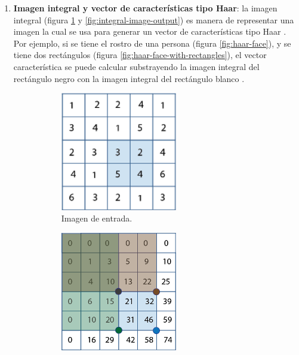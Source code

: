 \documentclass[a4paper,openright,12pt]{report}
\begin{document}
\begin{enumerate}
    \item \textbf{Imagen integral y vector de características tipo Haar}:
    la imagen integral (figura \ref{fig:integral-image-input} y
    \ref{fig:integral-image-output}) es manera de representar una imagen
    la cual se usa para generar un vector de características tipo Haar
    \cite{violajones}. Por ejemplo, si se tiene el rostro de una persona
    (figura \ref{fig:haar-face}), y se tiene dos rectángulos
    (figura \ref{fig:haar-face-with-rectangles}), el vector característica se
    puede calcular substrayendo la imagen integral del rectángulo negro con la
    imagen integral del rectángulo blanco \cite{wang2014analysis}.

    \begin{figure}[H]
      \begin{subfigure}[b]{0.4\textwidth}
        \includegraphics[width=0.6\textwidth]{../images/integral-image-input.png}
        \caption{Imagen de entrada.}
        \label{fig:integral-image-input}
      \end{subfigure}
      \hfill
      \begin{subfigure}[b]{0.4\textwidth}
        \includegraphics[width=0.6\textwidth]{../images/integral-image-output.png}

\end{subfigure}
\end{figure}
\end{enumerate}
\end{document}
